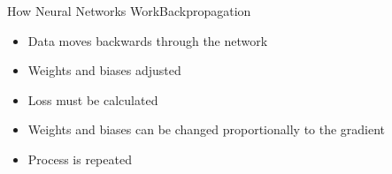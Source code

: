 \documentclass{beamer}
\begin{document}
\begin{frame}{How Neural Networks Work}{Backpropagation}
\begin{multicols}{2}
    \begin{itemize}
        \item Data moves backwards through the network
        \item Weights and biases adjusted
        \item Loss must be calculated
        \item Weights and biases can be changed proportionally to the gradient
        \item Process is repeated
    \end{itemize}

    \begin{center}
    \end{center}
\end{multicols}
\end{frame}
\end{document}
